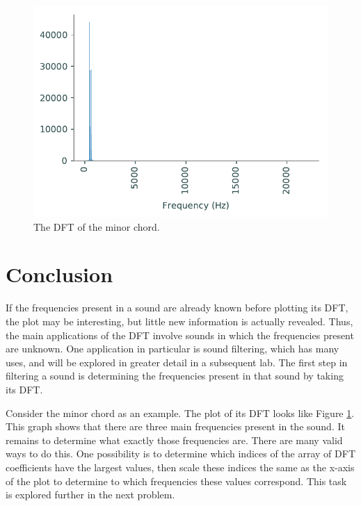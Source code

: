 \begin{center}
\begin{figure}[h]
\includegraphics[scale=1.0]{figures/dft_chord.pdf}
\caption{The DFT of the minor chord.}
\label{fig:dft_chord}
\end{figure}
\end{center}

\section*{Conclusion}

If the frequencies present in a sound are already known before plotting its DFT, the plot may be interesting, but little new information is actually revealed.
Thus, the main applications of the DFT involve sounds in which the frequencies present are unknown.
One application in particular is sound filtering, which has many uses, and will be explored in greater detail in a subsequent lab.
The first step in filtering a sound is determining the frequencies present in that sound by taking its DFT.

Consider the minor chord as an example.
The plot of its DFT looks like Figure \ref{fig:dft_chord}.
This graph shows that there are three main frequencies present in the sound.
It remains to determine what exactly those frequencies are.
There are many valid ways to do this.
One possibility is to determine which indices of the array of DFT coefficients have the largest values, then scale these indices the same as the x-axis of the plot to determine to which frequencies these values correspond.
This task is explored further in the next problem.

